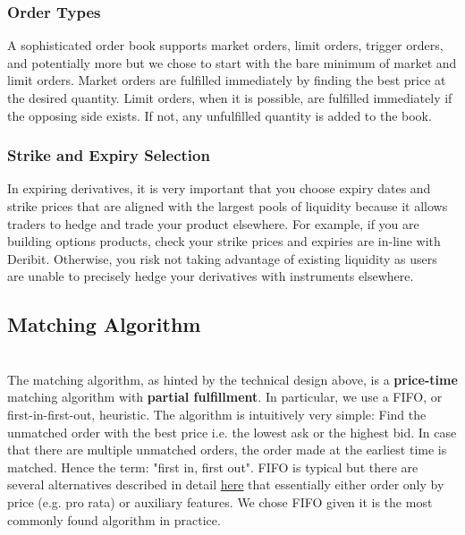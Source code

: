 \documentclass{article}
\begin{document}
\subsubsection{Order Types}

\noindent A sophisticated order book supports market orders,  limit orders, trigger orders, and potentially more but we chose to start with the bare minimum of market and limit orders. Market orders are fulfilled immediately by finding the best price at the desired quantity. Limit orders, when it is possible, are fulfilled immediately if the opposing side exists. If not, any unfulfilled quantity is added to the book. 

\subsubsection{Strike and Expiry Selection} 

In expiring derivatives, it is very important that you choose expiry dates and strike prices that are aligned with the largest pools of liquidity because it allows traders to hedge and trade your product elsewhere. For example, if you are building options products, check your strike prices and expiries are in-line with Deribit. Otherwise, you risk not taking advantage of existing liquidity as users are unable to precisely hedge your derivatives with instruments elsewhere. 

\subsection{Matching Algorithm} \\

The matching algorithm, as hinted by the technical design above, is a \textbf{price-time} matching algorithm with \textbf{partial fulfillment}. In particular, we use a FIFO, or first-in-first-out, heuristic. The algorithm is intuitively very simple: Find the unmatched order with the best price i.e. the lowest ask or the highest bid. In case that there are multiple unmatched orders, the order made at the earliest time is matched. Hence the term: "first in, first out". FIFO is typical but there are several alternatives described in detail \href{https://www.cmegroup.com/confluence/display/EPICSANDBOX/Supported+Matching+Algorithms}{here} that essentially either order only by price (e.g. pro rata) or auxiliary features. We chose FIFO given it is the most commonly found algorithm in practice. \\
\end{document}
